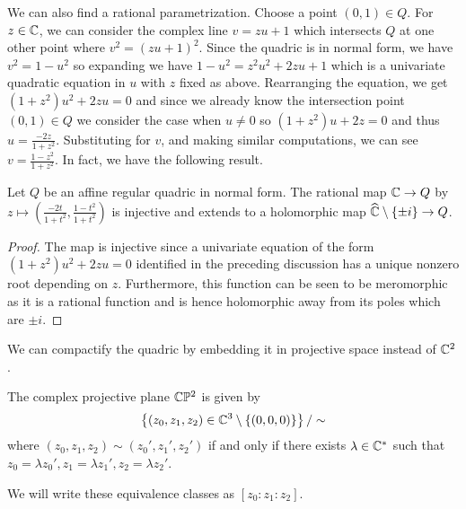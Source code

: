 We can also find a rational parametrization. Choose a point $(0,1)\in Q$. For $z\in\mathbb{C}$, we can consider the complex line $v=zu+1$ which intersects $Q$ at one other point where $v^{2}=(zu+1)^{2}$. Since the quadric is in normal form, we have $v^{2}=1-u^{2}$ so expanding we have $1-u^{2}=z^{2}u^{2}+2zu+1$ which is a univariate quadratic equation in $u$ with $z$ fixed as above. Rearranging the equation, we get $(1+z^{2})u^{2}+2zu=0$ and since we already know the intersection point $(0,1)\in Q$ we consider the case when $u\neq0$ so $(1+z^{2})u+2z=0$ and thus $u=\frac{-2z}{1+z^{2}}$. Substituting for $v$, and making similar computations, we can see $v=\frac{1-z^{2}}{1+z^{2}}$. In fact, we have the following result. 
\begin{proposition}\label{prop: injective on complement of pm i}
    Let $Q$ be an affine regular quadric in normal form. The rational map $\mathbb{C}\to Q$ by $z\mapsto\left(\frac{-2t}{1+t^{2}},\frac{1-t^{2}}{1+t^{2}}\right)$ is injective and extends to a holomorphic map $\widehat{\mathbb{C}}\setminus\{\pm i\}\to Q$. 
\end{proposition} 
\begin{proof}
    The map is injective since a univariate equation of the form $(1+z^{2})u^{2}+2zu=0$ identified in the preceding discussion has a unique nonzero root depending on $z$. Furthermore, this function can be seen to be meromorphic as it is a rational function and is hence holomorphic away from its poles which are $\pm i$. 
\end{proof}
We can compactify the quadric by embedding it in projective space instead of $\mathbb{C}^{2}$. 
\begin{definition}\label{def: complex projective plane}
    The complex projective plane $\mathbb{C}\mathbb{P}^{2}$ is given by 
    $$\left\{(z_{0},z_{1},z_{2})\in\mathbb{C}^{3}\setminus\{(0,0,0)\}\right\}/\sim$$
    where $(z_{0},z_{1},z_{2})\sim(z_{0}', z_{1}', z_{2}')$ if and only if there exists $\lambda\in\mathbb{C}^{*}$ such that $z_{0}=\lambda z_{0}', z_{1}=\lambda z_{1}', z_{2}=\lambda z_{2}'$. 
\end{definition}
We will write these equivalence classes as $[z_{0}:z_{1}:z_{2}]$. 

